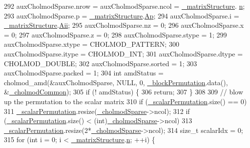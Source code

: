 \begin{DoxyCode}
292         auxCholmodSparse.nrow = auxCholmodSparse.ncol = \hyperlink{classg2o_1_1LinearSolverCholmod_af939e0478ab4fddb708729a8ab3b6560}{\_matrixStructure}.
      \hyperlink{classg2o_1_1MatrixStructure_aa91f296406c17ab3a826d03bf75cfea7}{n};
293         auxCholmodSparse.p = \hyperlink{classg2o_1_1LinearSolverCholmod_af939e0478ab4fddb708729a8ab3b6560}{\_matrixStructure}.\hyperlink{classg2o_1_1MatrixStructure_aeeff8e78fb766a433aecbfda4a2e3ffc}{Ap};
294         auxCholmodSparse.i = \hyperlink{classg2o_1_1LinearSolverCholmod_af939e0478ab4fddb708729a8ab3b6560}{\_matrixStructure}.\hyperlink{classg2o_1_1MatrixStructure_a7984bf429b8694070ab8db5f5852d8bb}{Aii};
295         auxCholmodSparse.nz = 0;
296         auxCholmodSparse.x = 0;
297         auxCholmodSparse.z = 0;
298         auxCholmodSparse.stype = 1;
299         auxCholmodSparse.xtype = CHOLMOD\_PATTERN;
300         auxCholmodSparse.itype = CHOLMOD\_INT;
301         auxCholmodSparse.dtype = CHOLMOD\_DOUBLE;
302         auxCholmodSparse.sorted = 1;
303         auxCholmodSparse.packed = 1;
304         \textcolor{keywordtype}{int} amdStatus = cholmod\_amd(&auxCholmodSparse, NULL, 0, 
      \hyperlink{classg2o_1_1LinearSolverCholmod_a6dc3dd0af697846996d6ca72da72ffbd}{\_blockPermutation}.data(), &\hyperlink{classg2o_1_1LinearSolverCholmod_ae7def9c6bf341e0d2f3a3936121fefa1}{\_cholmodCommon});
305         \textcolor{keywordflow}{if} (! amdStatus) \{
306           \textcolor{keywordflow}{return};
307         \}
308 
309         \textcolor{comment}{// blow up the permutation to the scalar matrix}
310         \textcolor{keywordflow}{if} (\hyperlink{classg2o_1_1LinearSolverCholmod_aa195d0f2a09641240e8ab7da8b516460}{\_scalarPermutation}.size() == 0)
311           \hyperlink{classg2o_1_1LinearSolverCholmod_aa195d0f2a09641240e8ab7da8b516460}{\_scalarPermutation}.resize(\hyperlink{classg2o_1_1LinearSolverCholmod_aefbdba58c18dc9eac831eb3d7c24fa18}{\_cholmodSparse}->ncol);
312         \textcolor{keywordflow}{if} (\hyperlink{classg2o_1_1LinearSolverCholmod_aa195d0f2a09641240e8ab7da8b516460}{\_scalarPermutation}.size() < (int)\hyperlink{classg2o_1_1LinearSolverCholmod_aefbdba58c18dc9eac831eb3d7c24fa18}{\_cholmodSparse}->ncol)
313           \hyperlink{classg2o_1_1LinearSolverCholmod_aa195d0f2a09641240e8ab7da8b516460}{\_scalarPermutation}.resize(2*\hyperlink{classg2o_1_1LinearSolverCholmod_aefbdba58c18dc9eac831eb3d7c24fa18}{\_cholmodSparse}->ncol);
314         \textcolor{keywordtype}{size\_t} scalarIdx = 0;
315         \textcolor{keywordflow}{for} (\textcolor{keywordtype}{int} i = 0; i < \hyperlink{classg2o_1_1LinearSolverCholmod_af939e0478ab4fddb708729a8ab3b6560}{\_matrixStructure}.\hyperlink{classg2o_1_1MatrixStructure_aa91f296406c17ab3a826d03bf75cfea7}{n}; ++i) \{

\end{DoxyCode}

